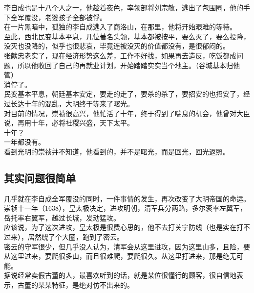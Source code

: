 \begin{multicols}{\theparacolNo}
李自成也是十八个人之一，他趁着夜色，率领部将刘宗敏，逃出了包围圈，他的手下全军覆没，老婆孩子全部被俘。\\

在一片黑暗中，孤独的李自成逃入了商洛山，在那里，他将开始艰难的等待。\\

至此，西北民变基本平息，几位著名头领，基本都被按平，要么灭了，要么投降，没灭也没降的，似乎也很悲哀，毕竟连被没灭的价值都没有，是很郁闷的。\\

张献忠老实了，现在经济形势这么差，工作不好找，如果再去造反，吃饭都成问题，所以他收回了自己的再就业计划，开始踏踏实实当个地主。（谷城基本归他管）\\

消停了。\\

民变基本平息，朝廷基本安定，要走的走了，要杀的杀了，要招安的也招安了，经过长达十年的混乱，大明终于等来了曙光。\\

对目前的情况，崇祯很高兴，他忙活了十年，终于得到了喘息的机会，他曾对大臣说，再用十年，必将社稷兴盛，天下太平。\\

十年？\\

一年都没有。\\

看到光明的崇祯并不知道，他看到的，并不是曙光，而是回光，回光返照。\\

\subsection{其实问题很简单}
几乎就在李自成全军覆没的同时，一件事情的发生，再次改变了大明帝国的命运。\\

崇祯十一年（1638），皇太极决定，进攻明朝，清军兵分两路，多尔衮率左翼军，岳托率右翼军，越过长城，发动猛攻。\\

应该说，为了这次进攻，皇太极是很费心思的，他不去打关宁防线（也是实在打不过来），居然绕了个大圈，跑到了密云。\\

密云的守军很少，但几乎没人认为，清军会从这里进攻，因为这里山多，且险，要从这里过来，要爬很多山，而且很难爬，要爬很久。从这里打进来，那是绝无可能。\\

据说经常卖假古董的人，最喜欢听到的话，就是某位很懂行的顾客，很自信地表示，古董的某某特征，是绝对仿不出来的。\\


\end{multicols}
